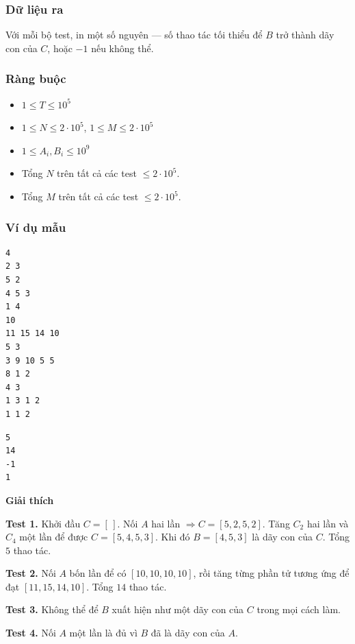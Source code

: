 \subsubsection*{Dữ liệu ra}
Với mỗi bộ test, in một số nguyên — số thao tác tối thiểu để $B$ trở thành dãy con của $C$, hoặc $-1$ nếu không thể.

\subsubsection*{Ràng buộc}
\begin{itemize}
  \item $1 \le T \le 10^5$
  \item $1 \le N \le 2\cdot 10^5$, \quad $1 \le M \le 2\cdot 10^5$
  \item $1 \le A_i, B_i \le 10^9$
  \item Tổng $N$ trên tất cả các test $\le 2\cdot 10^5$.
  \item Tổng $M$ trên tất cả các test $\le 2\cdot 10^5$.
\end{itemize}

\subsubsection*{Ví dụ mẫu}

\begin{tcolorbox}[title=Input]
\begin{verbatim}
4
2 3
5 2
4 5 3
1 4
10
11 15 14 10
5 3
3 9 10 5 5
8 1 2
4 3
1 3 1 2
1 1 2
\end{verbatim}
\end{tcolorbox}

\begin{tcolorbox}[title=Output]
\begin{verbatim}
5
14
-1
1
\end{verbatim}
\end{tcolorbox}

\textbf{Giải thích}

\textbf{Test 1.}  
Khởi đầu $C=[\,]$.  
Nối $A$ hai lần $\Rightarrow C=[5,2,5,2]$.  
Tăng $C_2$ hai lần và $C_4$ một lần để được $C=[5,4,5,3]$. Khi đó $B=[4,5,3]$ là dãy con của $C$. Tổng $5$ thao tác.

\textbf{Test 2.}  
Nối $A$ bốn lần để có $[10,10,10,10]$, rồi tăng từng phần tử tương ứng để đạt $[11,15,14,10]$. Tổng $14$ thao tác.

\textbf{Test 3.}  
Không thể để $B$ xuất hiện như một dãy con của $C$ trong mọi cách làm.

\textbf{Test 4.}  
Nối $A$ một lần là đủ vì $B$ đã là dãy con của $A$.
